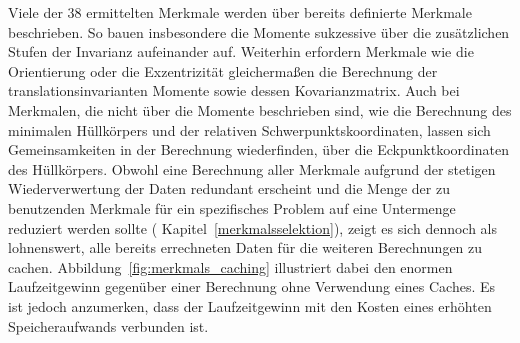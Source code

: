 

Viele der $38$ ermittelten Merkmale werden über bereits definierte Merkmale beschrieben.
So bauen insbesondere die Momente sukzessive über die zusätzlichen Stufen der Invarianz aufeinander auf.
Weiterhin erfordern Merkmale wie die Orientierung oder die Exzentrizität gleichermaßen die Berechnung der translationsinvarianten Momente sowie dessen Kovarianzmatrix.
Auch bei Merkmalen, die nicht über die Momente beschrieben sind, wie \zB{} die Berechnung des minimalen Hüllkörpers und der relativen Schwerpunktskoordinaten, lassen sich Gemeinsamkeiten in der Berechnung wiederfinden, \zB{} über die Eckpunktkoordinaten des Hüllkörpers.
Obwohl eine Berechnung aller Merkmale aufgrund der stetigen Wiederverwertung der Daten redundant erscheint und die Menge der zu benutzenden Merkmale für ein spezifisches Problem auf eine Untermenge reduziert werden sollte (\vgl{} Kapitel~\ref{merkmalsselektion}), zeigt es sich dennoch als lohnenswert, alle bereits errechneten Daten für die weiteren Berechnungen zu cachen.
Abbildung~\ref{fig:merkmals_caching} illustriert dabei den enormen Laufzeitgewinn gegenüber einer Berechnung ohne Verwendung eines Caches.
Es ist jedoch anzumerken, dass der Laufzeitgewinn mit den Kosten eines erhöhten Speicheraufwands verbunden ist.
